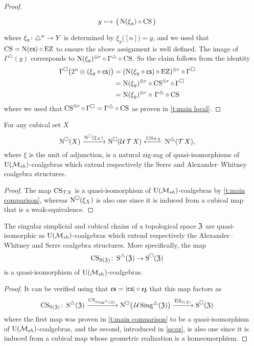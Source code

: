 \begin{proof}
\[\begin{tikzcd}[column sep=small, row sep=0]
		y \arrow[r,mapsto]& \big( \chains(\xi_y) \circ \CS \big)
	\end{tikzcd}
	\]
	where $\xi_y \colon \triangle^n \to Y$ is determined by $\xi_y \big( [n] \big) = y$, and we used that $\operatorname{CS} = \operatorname{N}(\operatorname{\mathsf{cs}}) \circ \operatorname{EZ}$ to ensure the above assignment is well defined.
	The image of $\Gamma^\triangle(y)$ corresponds to $\operatorname{N}(\xi_y)^{\otimes r} \circ \Gamma^\triangle \circ \operatorname{CS}$.
	So the claim follows from the identity
	\begin{align*}
		\Gamma^\square \big( 2^n \otimes (\xi_y \circ \operatorname{\mathsf{cs}}) \big) &=
		(\operatorname{N}(\xi_y \circ \operatorname{\mathsf{cs}}) \circ \operatorname{EZ})^{\otimes r} \circ \Gamma^\square \\ &=
		\operatorname{N}(\xi_y)^{\otimes r} \circ \operatorname{CS}^{\otimes r} \circ \, \Gamma^\square \\ &=
		\operatorname{N}(\xi_y)^{\otimes r} \circ \, \Gamma^\triangle \circ \operatorname{CS}
	\end{align*}
	where we used that $\operatorname{CS}^{\otimes r} \circ \, \Gamma^\square = \Gamma^\triangle \circ \operatorname{CS}$ as proven in \cref{t:main local}.
\end{proof}

\begin{corollary} \label{c:zig-zag}
	For any cubical set $X$
	\[
	\operatorname{N^{\square}}(X) \xrightarrow{\operatorname{N^{\square}}(\xi_X)}
	\operatorname{N^{\square}}(\operatorname{\mathcal{U}}{\operatorname{\mathcal{T}} X})
	\xleftarrow{\operatorname{CS}_{\mathcal{T} X}} \operatorname{N^{\triangle}}(\operatorname{\mathcal{T}} X),
	\]
	where $\xi$ is the unit of adjunction, is a natural zig-zag of quasi-isomorphisms of ${\operatorname{U}(\mathcal{M}_{sh})}$-coalgebras which extend respectively the Serre and Alexander--Whitney coalgebra structures.
\end{corollary}

\begin{proof}
	The map $\operatorname{CS}_{\mathcal{T} X}$ is a quasi-isomorphism of ${\operatorname{U}(\mathcal{M}_{sh})}$-coalgebras by \cref{t:main comparison}, whereas $\operatorname{N^{\square}}(\xi_X)$ is also one since it is induced from a cubical map that is a weak-equivalence.
\end{proof}

\begin{corollary} \label{c:cs e infty}
	The singular simplicial and cubical chains of a topological space $\mathfrak{Z}$ are quasi-isomorphic as ${\operatorname{U}(\mathcal{M}_{sh})}$-coalgebras which extend respectively the Alexander--Whitney and Serre coalgebra structures.
	More specifically, the map
	\[
	\operatorname{CS}_{\operatorname{S}(\mathfrak{Z})} \colon \operatorname{\operatorname{S}^{\triangle}}(\mathfrak{Z}) \to \operatorname{\operatorname{S}^{\square}}(\mathfrak{Z})
	\]
	is a quasi-isomorphism of ${\operatorname{U}(\mathcal{M}_{sh})}$-coalgebras.
\end{corollary}

\begin{proof}
	It can be verified using that $\operatorname{\mathfrak{cs}} = \lvert\operatorname{\mathsf{cs}}\rvert \circ \operatorname{\mathfrak{ez}}$ that this map factors as
	\[
	\operatorname{CS}_{\operatorname{S}(\mathfrak{Z})} \colon \operatorname{\operatorname{S}^{\triangle}}(\mathfrak{Z}) \xrightarrow{\operatorname{CS}_{\operatorname{Sing^{\triangle}}(\mathfrak{Z})}} \operatorname{N^{\square}}\!\big(\operatorname{\mathcal{U}}\operatorname{Sing^{\triangle}}(\mathfrak{Z})\big) \xrightarrow{\operatorname{EZ}_{\operatorname{S}(\mathfrak{Z})}} \operatorname{\operatorname{S}^{\square}}(\mathfrak{Z})
	\]
	where the first map was proven in \cref{t:main comparison} to be a quasi-isomorphism of ${\operatorname{U}(\mathcal{M}_{sh})}$-coalgebras, and the second, introduced in \cref{ss:ez}, is also one since it is induced from a cubical map whose geometric realization is a homeomorphism.
\end{proof}

